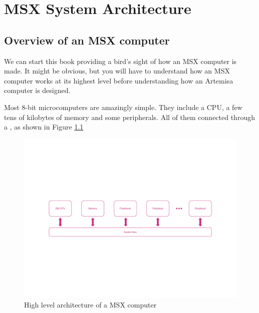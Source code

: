 \chapter{MSX System Architecture}

\section{Overview of an MSX computer}

We can start this book providing a bird’s sight of how an MSX computer is made. It might be obvious, but you will have to understand how an MSX computer works at its highest level before understanding how an Artemisa computer is designed.

Most 8-bit microcomputers are amazingly simple. They include a CPU, a few tens of kilobytes of memory and some peripherals. All of them connected through a , as shown in Figure \ref{fig:msx-arch-overview}

\begin{figure}
	\centering
	\includegraphics[width=\linewidth,trim={0cm 200 0 200}]{images/figures/msx-arch-overview}
	\caption{High level architecture of a MSX computer}
	\label{fig:msx-arch-overview}
\end{figure}

